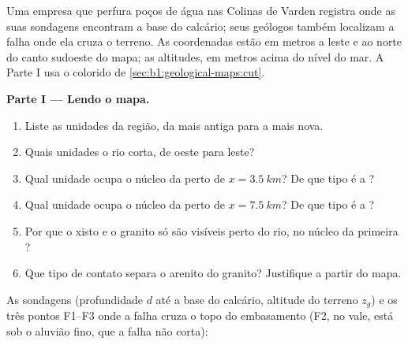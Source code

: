 \begin{problem}
\label{pb:b1:geological-maps:1}
Uma empresa que perfura poços de água nas Colinas de Varden registra onde as suas sondagens encontram a base do calcário; seus geólogos também localizam a falha onde ela cruza o terreno. As coordenadas estão em metros a leste e ao norte do canto sudoeste do mapa; as altitudes, em metros acima do nível do mar. A Parte I usa o  colorido de \cref{sec:b1:geological-maps:cut}.

\medskip
\noindent\textbf{Parte I --- Lendo o mapa.}
\begin{enumerate}
  \item Liste as unidades da região, da mais antiga para a mais nova.
  \item Quais unidades o rio corta, de oeste para leste?
  \item Qual unidade ocupa o núcleo da  perto de $x = \qty{3.5}{km}$? De que tipo é a ?
  \item Qual unidade ocupa o núcleo da  perto de $x = \qty{7.5}{km}$? De que tipo é a ?
  \item Por que o xisto e o granito só são visíveis perto do rio, no núcleo da primeira ?
  \item Que tipo de contato separa o arenito do granito? Justifique a partir do mapa.
\end{enumerate}

\medskip
\noindent As sondagens (profundidade $d$ até a base do calcário, altitude do terreno $z_g$) e os três pontos F1--F3 onde a falha cruza o topo do embasamento (F2, no vale, está sob o aluvião fino, que a falha não corta):


\end{problem}
